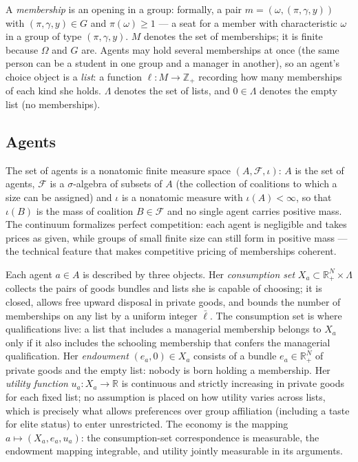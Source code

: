 \documentclass[12pt,letterpaper]{article}
\theoremstyle{definition}
\newcommand{\R}{\mathbb{R}}
\begin{document}
A \emph{membership} is an opening in a group: formally, a pair $m=(\omega,(\pi,\gamma,y))$ with $(\pi,\gamma,y)\in G$ and $\pi(\omega)\geq 1$ --- a seat for a member with characteristic $\omega$ in a group of type $(\pi,\gamma,y)$.
$M$ denotes the set of memberships; it is finite because $\Omega$ and $G$ are.
Agents may hold several memberships at once (the same person can be a student in one group and a manager in another), so an agent's choice object is a \emph{list}: a function $\ell:M\rightarrow\mathbb{Z}_+$ recording how many memberships of each kind she holds.
$\Lambda$ denotes the set of lists, and $0\in\Lambda$ denotes the empty list (no memberships).

\subsection{Agents}

The set of agents is a nonatomic finite measure space $(A,\mathcal{F},\iota)$: $A$ is the set of agents, $\mathcal{F}$ is a $\sigma$-algebra of subsets of $A$ (the collection of coalitions to which a size can be assigned) and $\iota$ is a nonatomic measure with $\iota(A)<\infty$, so that $\iota(B)$ is the mass of coalition $B\in\mathcal{F}$ and no single agent carries positive mass.
The continuum formalizes perfect competition: each agent is negligible and takes prices as given, while groups of small finite size can still form in positive mass --- the technical feature that makes competitive pricing of memberships coherent.

Each agent $a\in A$ is described by three objects.
Her \emph{consumption set} $X_a\subset\R^N_+\times\Lambda$ collects the pairs of goods bundles and lists she is capable of choosing; it is closed, allows free upward disposal in private goods, and bounds the number of memberships on any list by a uniform integer $\bar{\ell}$.
The consumption set is where qualifications live: a list that includes a managerial membership belongs to $X_a$ only if it also includes the schooling membership that confers the managerial qualification.
Her \emph{endowment} $(e_a,0)\in X_a$ consists of a bundle $e_a\in\R^N_+$ of private goods and the empty list: nobody is born holding a membership.
Her \emph{utility function} $u_a:X_a\rightarrow\R$ is continuous and strictly increasing in private goods for each fixed list; no assumption is placed on how utility varies across lists, which is precisely what allows preferences over group affiliation (including a taste for elite status) to enter unrestricted.
The economy is the mapping $a\mapsto(X_a,e_a,u_a)$: the consumption-set correspondence is measurable, the endowment mapping integrable, and utility jointly measurable in its arguments.
\end{document}
